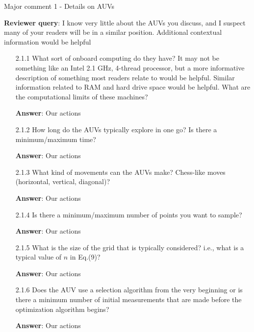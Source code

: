 \documentclass[a4paper]{article}
\def\reply{\textbf{Reviewer query}}
\def\action{\textbf{Answer}}
\begin{document}
\begin{answers}
\item{Major comment 1 - Details on AUVs}\label{q12}

\reply: I know very little about the AUVs you discuss, and I suspect many of your readers will be in a similar position. Additional contextual information would be helpful

\begin{itemize}[noitemsep,topsep=0pt,parsep=0pt,partopsep=0pt]

\item[2.1.1] What sort of onboard computing do they have? It may not be something like an Intel 2.1 GHz, 4-thread processor, but a more informative description of something most readers relate to would be helpful. Similar information related to RAM and hard drive space would be helpful. What are the computational limits of these machines?\par
\action: Our actions
\vspace{1em}

\item[2.1.2] How long do the AUVs typically explore in one go? Is there a minimum/maximum time?\par 
\action: Our actions
\vspace{1em}

\item[2.1.3] What kind of movements can the AUVs make? Chess-like moves (horizontal, vertical, diagonal)?\par  
\action: Our actions
\vspace{1em}

\item[2.1.4] Is there a minimum/maximum number of points you want to sample?\par
\action: Our actions
\vspace{1em}

\item[2.1.5] What is the size of the grid that is typically considered? i.e., what is a typical value of $n$ in Eq.(9)?\par 
\action: Our actions
\vspace{1em}

\item[2.1.6] Does the AUV use a selection algorithm from the very beginning or is there a minimum number of initial measurements that are made before the optimization algorithm begins?\par
\action: Our actions
\vspace{1em}


\end{itemize}
\end{answers}
\end{document}
